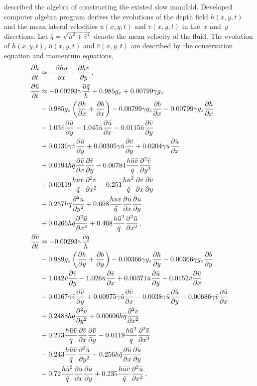 \documentclass[12pt,a5paper]{article}
\newcommand{\uu}{{\bar u}}
\newcommand{\vv}{{\bar v}}
\newcommand{\bq}{{\bar q}}
\begin{document}
\cite{Roberts:2008fk} described the algebra of constructing the existed slow manifold. 
Developed computer algebra program derives the evolutions of the depth field $h(x,y,t)$ and the mean lateral velocities $\uu(x,y,t)$ and $\vv(x,y,t)$ in the~$x$ and~$y$ directions. 
Let $\bq=\sqrt{\uu^2+\vv^2}$ denote the mean velocity of the fluid.
The evolution of $h(x,y,t)$, $\uu(x,y,t)$ and $\vv(x,y,t)$ are described by the conservation equation and momentum equations,
\begin{align}
\frac{\partial h}{\partial t}&
\approx-\frac{\partial h\bar u}{\partial x}-\frac{\partial h\bar v}{\partial y}\,,\label{smag:h}
\\
\frac{\partial\bar u}{\partial t}&
\approx-0.00293\gamma\frac{\bar u\bq}{h}+0.985g_x+0.00799\gamma g_x
\nonumber\\&
-0.985g_z\left(\frac{\partial h}{\partial x}+\frac{\partial b}{\partial x}\right)-0.00799\gamma g_z\D xb
-0.00799\gamma g_z\D xh
\nonumber\\&
-1.03\bar v\frac{\partial\bar u}{\partial y}-1.045\bar u\frac{\partial\bar u}{\partial x}-0.0115\uu\D{y}{\vv}
\nonumber\\&
+0.0136\gamma\vv\D{y}{\uu}+0.00305\gamma\uu\D{y}{\vv}+0.0204\gamma\uu\D{x}{\uu}
\nonumber\\&
+0.0194h\bq\D x\vv\D y\vv-0.00784\frac{h\uu\vv}{\bq}\DD{y}{\vv}
\nonumber\\&
+0.00119\frac{h\uu\vv}{\bq}\DD x\vv-0.251\frac{h\uu^2}{\bq}\D x\vv\D y\vv
\nonumber\\&
+0.237h\bq\DD y\uu+0.698\frac{h\uu\vv}{\bq}\D x\uu\D y\uu
\nonumber\\&
+0.0266h\bq\DD x\uu+0.468\frac{h\uu^2}{\bq}\DD x\uu\,,
\label{smag:u}
\\
\frac{\partial\bar v}{\partial t}&
\approx-0.00293\gamma\frac{\bar v\bq}{h}
\nonumber\\&
-0.989g_z\left(\frac{\partial h}{\partial y}+\frac{\partial b}{\partial y}\right)
-0.00366\gamma g_z\D yh-0.00366\gamma g_z\D yb
\nonumber\\&
-1.042\bar v\frac{\partial\bar v}{\partial y}-1.026\bar u\frac{\partial\bar v}{\partial x}
+0.00371\uu\D y\uu-0.0152\vv\D x\uu
\nonumber\\&
+0.0167\gamma\vv\D y\vv+0.00975\gamma\uu\D x\vv-0.0038\gamma\uu\D y\uu+0.00686\gamma\vv\D x\uu
\nonumber\\&
+0.2488h\bq\DD y\vv+0.00606h\bq\DD x\vv
\nonumber\\&
+0.213\frac{h\uu\vv}{\bq}\D x\vv\D y\vv-0.0119\frac{h\uu^2}{\bq}\DD x\vv
\nonumber\\&
-0.243\frac{h\uu\vv}{\bq}\DD y\uu+0.256h\bq\D x\uu\D y\uu
\nonumber\\&
-0.72\frac{h\uu^2}{\bq}\D x\uu\D y\uu+0.235\frac{h\uu\vv}{\bq}\DD x\uu
\,,\label{smag:v}
\end{align}
\end{document}
